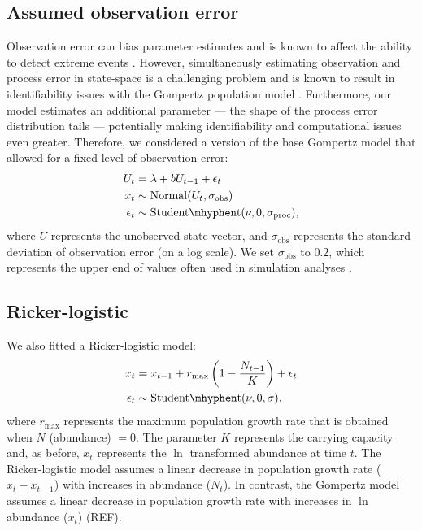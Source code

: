 \subsection{Assumed observation error}

Observation error can bias parameter estimates \citep[e.g.][]{knape2012} and is known to affect the ability to detect extreme events \citep{ward2007}. However, simultaneously estimating observation and process error in state-space is a challenging problem and is known to result in identifiability issues with the Gompertz population model \citep{knape2008}. Furthermore, our model estimates an additional parameter --- the shape of the process error distribution tails --- potentially making identifiability and computational issues even greater. Therefore, we considered a version of the base Gompertz model that allowed for a fixed level of observation error:
\begin{align*}
U_t &= \lambda + b U_{t-1} + \epsilon_t\\
x_t &\sim \mathrm{Normal}(U_t, \sigma_\mathrm{obs})\\
\epsilon_t &\sim \mathrm{Student\mhyphen t}(\nu, 0, \sigma_\mathrm{proc}),
\end{align*}
where $U$ represents the unobserved state vector, and $\sigma_\mathrm{obs}$ represents the standard deviation of observation error (on a log scale). We set $\sigma_\mathrm{obs}$ to $0.2$, which represents the upper end of values often used in simulation analyses \citep[e.g.][]{valpine2002, thorson2014b}.

\subsection{Ricker-logistic}

We also fitted a Ricker-logistic model:
\begin{align*}
x_t &= x_{t-1} + r_{\mathrm{max}}\left(1 - \frac{N_{t-1}}{K}\right) + \epsilon_t\\
\epsilon_t &\sim \mathrm{Student\mhyphen t}(\nu, 0, \sigma),
\end{align*}
where $r_\mathrm{max}$ represents the maximum population growth rate that is obtained when $N$ (abundance) $= 0$. The parameter $K$ represents the carrying capacity and, as before, $x_t$ represents the $\ln$ transformed abundance at time $t$. The Ricker-logistic model assumes a linear decrease in population growth rate ($x_t - x_{t-1}$) with increases in abundance ($N_t$). In contrast, the Gompertz model assumes a linear decrease in population growth rate with increases in $\ln$ abundance ($x_t$) (REF).


